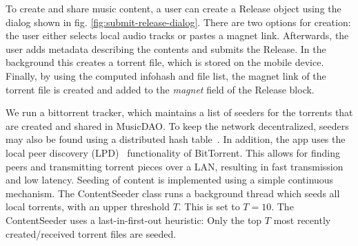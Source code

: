 To create and share music content, a user can create a Release object using the dialog shown in fig. \ref{fig:submit-release-dialog}. There are two options for creation: the user either selects local audio tracks or pastes a magnet link. Afterwards, the user adds metadata describing the contents and submits the Release. In the background this creates a torrent file, which is stored on the mobile device. Finally, by using the computed infohash and file list, the magnet link of the torrent file is created and added to the \textit{magnet} field of the Release block.

We run a bittorrent tracker, which maintains a list of seeders for the torrents that are created and shared in MusicDAO. To keep the network decentralized, seeders may also be found using a distributed hash table~\citep{dht2019}. In addition, the app uses the local peer discovery (LPD)~\citep{bittorrentbep142015} functionality of BitTorrent. This allows for finding peers and transmitting torrent pieces over a LAN, resulting in fast transmission and low latency.
\label{sec:content-seeding}
Seeding of content is implemented using a simple continuous mechanism. The ContentSeeder class runs a background thread which seeds all local torrents, with an upper threshold \(T\). This is set to \(T=10\). The ContentSeeder uses a last-in-first-out heuristic: Only the top \(T\) most recently created/received torrent files are seeded.

